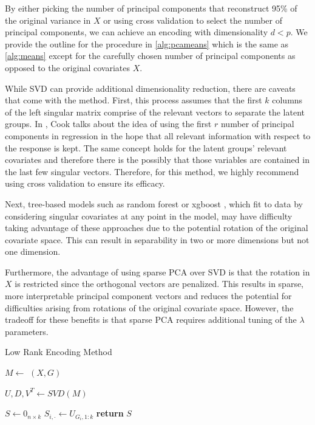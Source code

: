 \documentclass{article}
\theoremstyle{plain}
\theoremstyle{definition}
\theoremstyle{remark}
\begin{document}
 By either picking the number of principal components that reconstruct 95\% of the original variance in $X$ or using cross validation to select the number of principal components, we can achieve an encoding with dimensionality $d<p$. We provide the outline for the procedure in \ref{alg:pcameans} which is the same as \ref{alg:means} except for the carefully chosen number of principal components as opposed to the original covariates $X$.

While SVD can provide additional dimensionality reduction, there are caveats that come with the method. First, this process assumes that the first $k$ columns of the left singular matrix comprise of the relevant vectors to separate the latent groups. In \cite{cook2007fisher}, Cook talks about the idea of using the first $r$ number of principal components in regression in the hope that all relevant information with respect to the response is kept. The same concept holds for the latent groups' relevant covariates and therefore there is the possibly that those variables are contained in the last few singular vectors. Therefore, for this method, we highly recommend using cross validation to ensure its efficacy.

Next, tree-based models such as random forest \cite{breiman2001random} or xgboost \cite{chen2016xgboost}, which fit to data by considering singular covariates at any point in the model, may have difficulty taking advantage of these approaches due to the potential rotation of the original covariate space. This can result in separability in two or more dimensions but not one dimension.

Furthermore, the advantage of using sparse PCA over SVD is that the rotation in $X$ is restricted since the orthogonal vectors are penalized. This results in sparse, more interpretable principal component vectors and reduces the potential for difficulties arising from rotations of the original covariate space. However, the tradeoff for these benefits is that sparse PCA requires additional tuning of the $\lambda$ parameters.



\begin{algorithm}
\caption{Low Rank Encoding Method}\label{alg:lowrankmethod}
\begin{algorithmic}[1]

\State $M \gets$ $(X, G)$

\State $U,D,V^T \gets SVD(M)$

\State $S \gets 0_{n \times k}$
  \State $S_{i,\cdot} \gets U_{G_{i},1:k}$
\EndFor
\State \textbf{return} $S$
\EndProcedure
\end{algorithmic}
\end{algorithm}
\end{document}
